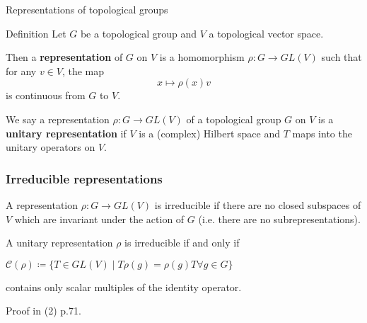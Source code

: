 \documentclass[mathserif
, handout
]{beamer}
\begin{document}
\begin{frame}{Representations of topological groups}
    \begin{block}{Definition}
        Let $G$ be a topological group and $V$ a topological vector space.
        
        Then a \textbf{representation} of $G$ on $V$ is a %
        homomorphism $\rho\colon G\to GL(V)$ such that for any $v\in V$, the map \[x\mapsto \rho(x)v\] is continuous from $G$ to $V$. %
    \end{block} 
    \pause

    We say a representation $\rho\colon G\to GL(V)$ of a topological group $G$ on $V$ is a \textbf{unitary representation} if $V$ is a (complex) Hilbert space and $T$ maps into the unitary operators on $V$. %
\end{frame}

\begin{frame}
    \frametitle{Irreducible representations}
    A representation $\rho\colon G\to GL(V)$ is irreducible if there are no closed subspaces of $V$ which are invariant under the action of $G$ (i.e. there are no subrepresentations).
    \pause

    \begin{Theorem}
        A unitary representation $\rho$ is irreducible if and only if \begin{center}
            $\mathcal{C}(\rho)\coloneqq \{T\in GL(V)\mid T\rho(g) = \rho(g) T\forall g\in G\}$
        \end{center} %
        contains only scalar multiples of the identity operator.
    \end{Theorem} Proof in (2) p.71.
\end{frame}
\end{document}
